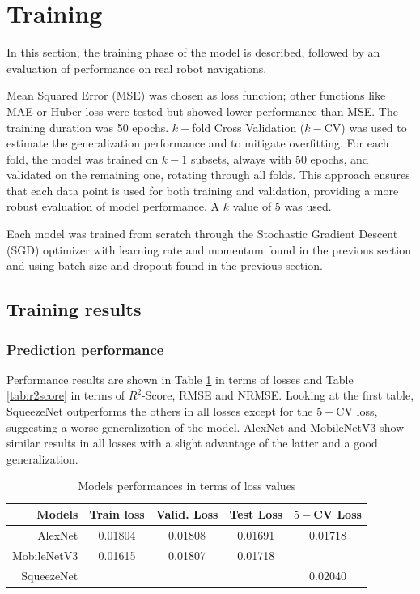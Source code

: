 \section{Training}

In this section, the training phase of the model is described, followed by an evaluation of performance on real robot navigations.

Mean Squared Error (MSE) was chosen as loss function; other functions like MAE or Huber loss were tested but showed lower performance than MSE. The training duration was 50 epochs. $k-$fold Cross Validation ($k-$CV) was used to estimate the generalization performance and to mitigate overfitting. For each fold, the model was trained on $k-1$ subsets, always with 50 epochs, and validated on the remaining one, rotating through all folds. This approach ensures that each data point is used for both training and validation, providing a more robust evaluation of model performance. A $k$ value of 5 was used.

Each model was trained from scratch through the Stochastic Gradient Descent (SGD) optimizer with learning rate and momentum found in the previous section and using batch size and dropout found in the previous section.

\subsection{Training results}
\subsubsection{Prediction performance}
Performance results are shown in Table \ref{tab:training} in terms of losses and Table \ref{tab:r2score} in terms of $R^2$-Score, RMSE and NRMSE. Looking at the first table, SqueezeNet outperforms the others in all losses
except for the $5-$CV loss, suggesting a worse generalization of the model.
AlexNet and MobileNetV3 show similar results in all losses with a slight advantage of the latter and a good generalization.

\begin{table}[H]
    \centering
    \begin{tabular}{|r|c|c|c|c|} \hline
        \textbf{Models} & \textbf{Train loss}   & \textbf{Valid. Loss}   & \textbf{Test Loss} & \textbf{$5-$CV Loss} \\\hline
        AlexNet     & 0.01804 & 0.01808 & 0.01691 & 0.01718 \\\hline
        MobileNetV3 & 0.01615 & 0.01807 & 0.01718 & \color{red}{0.01667}  \\\hline
        SqueezeNet  & \color{red}{0.01340} & \color{red}{0.01437} & \color{red}{0.01309} & 0.02040 \\\hline
    \end{tabular}
    \caption{Models performances in terms of loss values\label{tab:training}}
\end{table}

